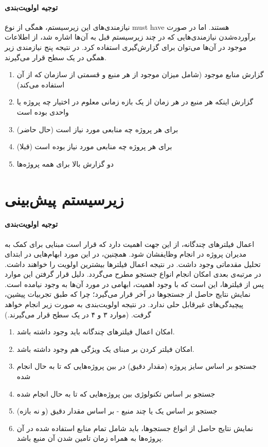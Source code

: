 \paragraph{توجیه اولویت‌بندی}
نیازمندی‌های این زیرسیستم، همگی از نوع must have هستند. اما در صورت برآورده‌شدن نیازمندی‌هایی که در چند زیرسیستم قبل به آن‌ها اشاره شد، از اطلاعات موجود در آن‌ها می‌توان برای گزارش‌گیری استفاده کرد. در نتیجه پنج نیازمندی زیر همگی در یک سطح قرار می‌گیرند.
\begin{enumerate}
	\item گزارش منابع موجود (شامل میزان موجود از هر منبع و قسمتی از سازمان که از آن استفاده می‌کند)
	\item گزارش اینکه هر منبع در هر زمان از یک بازه زمانی معلوم در اختیار چه پروژه یا واحدی بوده است
	\item برای هر پروژه چه منابعی مورد نیاز است (حال حاضر)
	\item برای هر پروژه چه منابعی مورد نیاز بوده است (قبلا)
	\item دو گزارش بالا برای همه پروژه‌ها 
\end{enumerate}

\section{زیرسیستم پیش‌بینی}
\paragraph{توجیه اولویت‌بندی}
اعمال فیلترهای چندگانه، از این جهت اهمیت دارد که قرار است مبنایی برای کمک به مدیران پروژه در انجام وظایفشان شود. همچنین، در این مورد ابهام‌هایی در ابتدای تحلیل مقدماتی وجود داشت. در نتیجه اعمال فیلترها بیشترین اولویت را خواهند داشت. در مرتبه‌ی بعدی امکان انجام انواع جستجو مطرح می‌گردد. دلیل قرار گرفتن این موارد پس از فیلترها، این است که با وجود اهمیت، ابهامی در مورد آن‌ها به وجود نیامده است. نمایش نتایج حاصل از جستجوها در آخر قرار می‌گیرد؛ چرا که طبق تجربیات پیشین، پیچیدگی‌های غیرقابل حلی ندارد. در نتیجه اولویت‌بندی به صورت زیر انجام خواهد گرفت. (موارد ۳ و ۴ در یک سطح قرار می‌گیرند.)
\begin{enumerate}
	\item امکان اعمال فیلترهای چندگانه باید وجود داشته باشد.
	\item امکان فیلتر کردن بر مبنای یک ویژگی هم وجود داشته باشد.
	\item جستجو بر اساس سایز پروژه (مقدار دقیق) در بین پروژه‌هایی که تا به حال انجام شده
	\item جستجو بر اساس تکنولوژی بین پروژه‌هایی که تا به حال انجام شده
	\item جستجو بر اساس یک یا چند منبع - بر اساس مقدار دقیق (و نه بازه)
	
	\item نمایش نتایج حاصل از انواع  جستجوها، باید شامل تمام منابع استفاده شده در آن پروژه‌ها به همراه زمان تامین شدن آن منبع باشد.
\end{enumerate}

